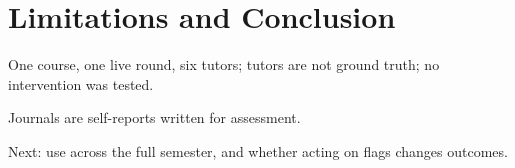 \section{Limitations and Conclusion}
\label{sec:conclusion}

\begin{outline}
  \item One course, one live round, six tutors; tutors are not ground truth; no
    intervention was tested.
  \item Journals are self-reports written for assessment.
  \item Next: use across the full semester, and whether acting on flags changes outcomes.
\end{outline}
